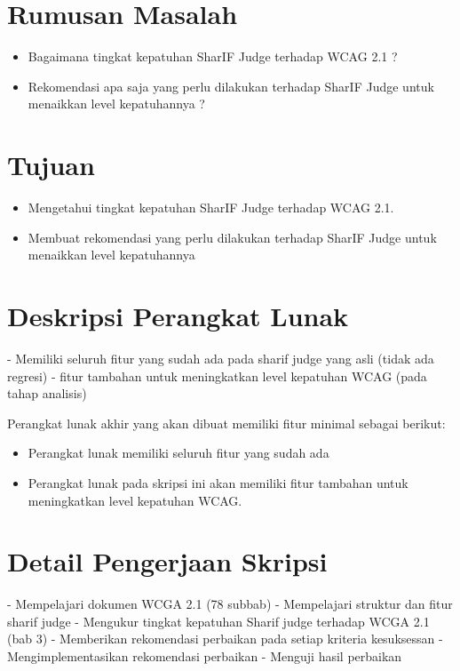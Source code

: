 \documentclass[a4paper,twoside]{article}
\begin{document}
\section{Rumusan Masalah}
\begin{itemize}
	\item Bagaimana tingkat kepatuhan SharIF Judge terhadap WCAG 2.1 ?
	\item Rekomendasi apa saja yang perlu dilakukan terhadap SharIF Judge untuk menaikkan level kepatuhannya ?
\end{itemize}

\section{Tujuan}
\begin{itemize}
	\item Mengetahui tingkat kepatuhan SharIF Judge terhadap WCAG 2.1.
	\item Membuat rekomendasi yang perlu dilakukan terhadap SharIF Judge untuk menaikkan level kepatuhannya
\end{itemize}                         

\section{Deskripsi Perangkat Lunak}
- Memiliki seluruh fitur yang sudah ada pada sharif judge yang asli (tidak ada regresi)
- fitur tambahan untuk meningkatkan level kepatuhan WCAG (pada tahap analisis)

Perangkat lunak akhir yang akan dibuat memiliki fitur minimal sebagai berikut:
\begin{itemize}
	\item Perangkat lunak memiliki seluruh fitur yang sudah ada
	\item Perangkat lunak pada skripsi ini akan memiliki fitur tambahan untuk meningkatkan level kepatuhan WCAG.
\end{itemize}

\section{Detail Pengerjaan Skripsi}
- Mempelajari dokumen WCGA 2.1 (78 subbab)
- Mempelajari struktur dan fitur sharif judge
- Mengukur tingkat kepatuhan Sharif judge terhadap WCGA 2.1 (bab 3)
- Memberikan rekomendasi perbaikan pada setiap kriteria kesuksessan
- Mengimplementasikan rekomendasi perbaikan
- Menguji hasil perbaikan
\end{document}
